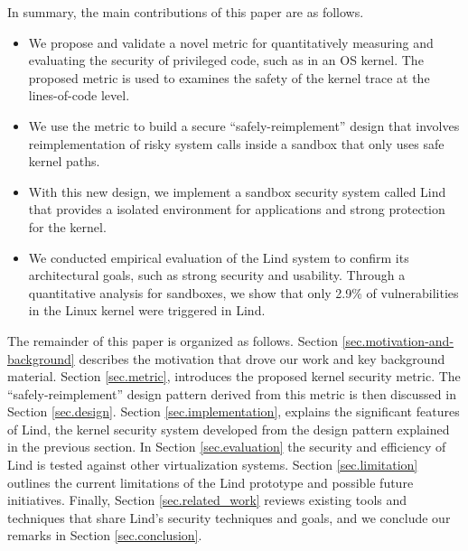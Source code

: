 In summary,
the main contributions of this paper are as follows. %
\begin{itemize}
\item
We propose and validate a novel metric for quantitatively measuring and
evaluating the security of privileged code, such as in an OS kernel.
The proposed metric is used to examines the safety of the kernel trace at the lines-of-code level.


\item
We use the metric to build a secure ``safely-reimplement'' design that
involves reimplementation of risky system calls inside a
sandbox that only uses safe kernel paths.

\item
With this new design, we implement a sandbox security system called Lind
that provides a isolated environment for applications and strong protection for the kernel.

\item
We conducted empirical evaluation of the Lind system to confirm its architectural
 goals, such as strong security and usability.
Through a quantitative analysis for sandboxes, we show that only 2.9\% of
vulnerabilities in the Linux kernel were triggered in Lind.


\end{itemize}

The remainder of this paper is organized as follows.
Section \ref{sec.motivation-and-background} describes the motivation that drove our work and key background material.
Section \ref{sec.metric}, introduces the proposed kernel security metric. The
``safely-reimplement'' design pattern derived from this metric is then discussed in Section \ref{sec.design}. Section \ref{sec.implementation},
explains the significant features of Lind, the kernel security system developed
from the design pattern explained in the previous section. In Section \ref{sec.evaluation} the security and
efficiency of Lind is tested against other virtualization systems.
Section \ref{sec.limitation} outlines the current
limitations of the Lind prototype and possible future initiatives.
Finally, Section \ref{sec.related_work} reviews existing tools and techniques that share
Lind's security techniques and goals, and we conclude our remarks in
Section \ref{sec.conclusion}.